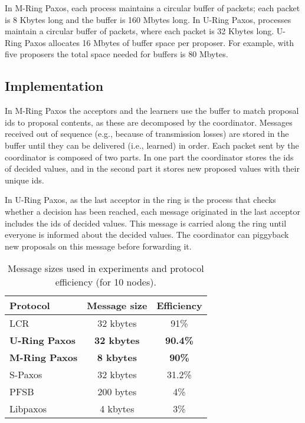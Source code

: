 \documentclass[final,3p,times,twocolumn,authoryear]{elsarticle}
\begin{document}
In M-Ring Paxos, each process maintains a circular buffer of packets; each packet is 8 Kbytes long and the buffer is 160 Mbytes long. In U-Ring Paxos, processes maintain a circular buffer of packets, where each packet is 32 Kbytes long. U-Ring Paxos allocates 16 Mbytes of buffer space per proposer. For example, with five proposers the total space needed for buffers is 80 Mbytes.


\subsection{Implementation}

In M-Ring Paxos the acceptors and the learners use the buffer to match proposal ids to proposal contents, as these are decomposed by the coordinator. Messages received out of sequence (e.g., because of transmission losses) are stored in the buffer until they can be delivered (i.e., learned) in order.
Each packet sent by the coordinator is composed of two parts. In one part the coordinator stores the ids of decided values, and in the second part it stores new proposed values with their unique ids. 


In U-Ring Paxos, as the last acceptor in the ring is the process that checks whether a decision has been reached, each message originated in the last acceptor includes the ids of decided values. This message is carried along the ring until everyone is informed about the decided values. The coordinator can piggyback new proposals on this message before forwarding it. 


\begin{table}[h]
\center
\caption{Message sizes used in experiments and protocol efficiency (for 10 nodes).}\vspace{4mm}
\label{table:mte}
\begin{tabular}{l|c|c} \hline
Protocol            		& Message size & Efficiency \\ \hline
LCR				& 32 kbytes 	& 91\% \\
\bf{U-Ring Paxos}	& \bf{32 kbytes}	& \bf{90.4}\% \\
\bf{M-Ring Paxos}	& \bf{8 kbytes}	& \bf{90}\% \\
S-Paxos	& 32 kbytes	& 31.2\% \\
PFSB			& 200 bytes	& 4\% \\ 
Libpaxos			& 4 kbytes		& 3\% \\ \hline
\end{tabular}


\end{table}
\end{document}
